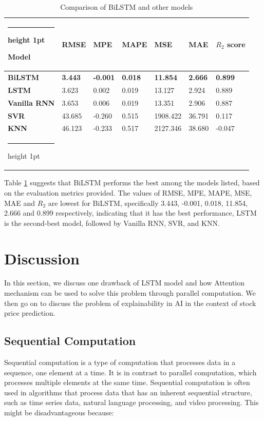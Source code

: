\documentclass[a4paper]{article}
\makeatletter
\newcommand{\thickhline}{%
    \noalign {\ifnum 0=`}\fi \hrule height 1pt
    \futurelet \reserved@a \@xhline
}
\makeatother
\begin{document}
\begin{table}[!h]
\centering
\caption{Comparison of BiLSTM and other models}
\label{table:model}
\vspace{5pt}
\begin{tabular}{lllllll}
\thickhline
\textbf{Model} & \textbf{RMSE} & \textbf{MPE} & \textbf{MAPE} & \textbf{MSE} &\textbf{ MAE} & \textbf{$R_2$ score} \\ 
\hline
\textbf{BiLSTM} & \textbf{3.443} & \textbf{-0.001} & \textbf{0.018} & \textbf{11.854} & \textbf{2.666} & \textbf{0.899}\\
\hline
\textbf{LSTM} & 3.623 & 0.002 & 0.019 & 13.127 & 2.924 & 0.889 \\ 
\textbf{Vanilla RNN} & 3.653 & 0.006 & 0.019 & 13.351 & 2.906 & 0.887 \\
\textbf{SVR} & 43.685 & -0.260 & 0.515 & 1908.422 & 36.791 & 0.117 \\
\textbf{KNN} & 46.123 & -0.233 & 0.517 & 2127.346 & 38.680 & -0.047 \\
\thickhline
\end{tabular}

\end{table}

Table \ref{table:model} suggests that BiLSTM performs the best among the models listed, based on the evaluation metrics provided. The values of RMSE, MPE, MAPE, MSE, MAE and $R_2$ are lowest for BiLSTM, specifically 3.443, -0.001, 0.018, 11.854, 2.666 and 0.899 respectively, indicating that it has the best performance, LSTM is the second-best model, followed by Vanilla RNN, SVR, and KNN.
\section{Discussion}

In this section, we discuss one drawback of LSTM model and how Attention mechanism can be used to solve this problem through parallel computation. We then go on to discuss the problem of explainability in AI in the context of stock price prediction.
\subsection{Sequential Computation}

Sequential computation is a type of computation that processes data in a sequence, one element at a time. It is in contrast to parallel computation, which processes multiple elements at the same time. Sequential computation is often used in algorithms that process data that has an inherent sequential structure, such as time series data, natural language processing, and video processing. This might be disadvantageous because:
\end{document}
